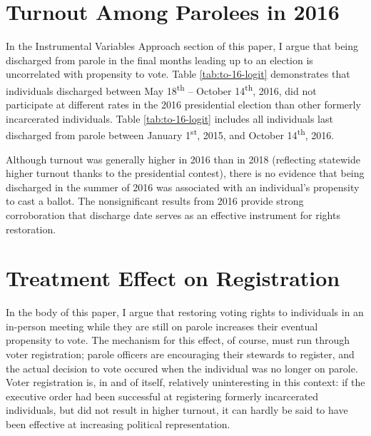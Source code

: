 \documentclass[
  12pt,
]{article}
\author{}
\date{\vspace{-2.5em}}
\begin{document}
\doublespace

\hypertarget{turnout-among-parolees-in-2016}{%
\section*{Turnout Among Parolees in 2016}\label{turnout-among-parolees-in-2016}}

In the Instrumental Variables Approach section of this paper, I argue that being discharged from parole in the final months leading up to an election is uncorrelated with propensity to vote. Table \ref{tab:to-16-logit} demonstrates that individuals discharged between May 18\textsuperscript{th} -- October 14\textsuperscript{th}, 2016, did not participate at different rates in the 2016 presidential election than other formerly incarcerated individuals. Table \ref{tab:to-16-logit} includes all individuals last discharged from parole between January 1\textsuperscript{st}, 2015, and October 14\textsuperscript{th}, 2016.

\begin{singlespace}


\end{singlespace}

Although turnout was generally higher in 2016 than in 2018 (reflecting statewide higher turnout thanks to the presidential contest), there is no evidence that being discharged in the summer of 2016 was associated with an individual's propensity to cast a ballot. The nonsignificant results from 2016 provide strong corroboration that discharge date serves as an effective instrument for rights restoration.

\hypertarget{treatment-effect-on-registration}{%
\section*{Treatment Effect on Registration}\label{treatment-effect-on-registration}}

In the body of this paper, I argue that restoring voting rights to individuals in an in-person meeting while they are still on parole increases their eventual propensity to vote. The mechanism for this effect, of course, must run through voter registration; parole officers are encouraging their stewards to register, and the actual decision to vote occured when the individual was no longer on parole. Voter registration is, in and of itself, relatively uninteresting in this context: if the executive order had been successful at registering formerly incarcerated individuals, but did not result in higher turnout, it can hardly be said to have been effective at increasing political representation.
\end{document}
